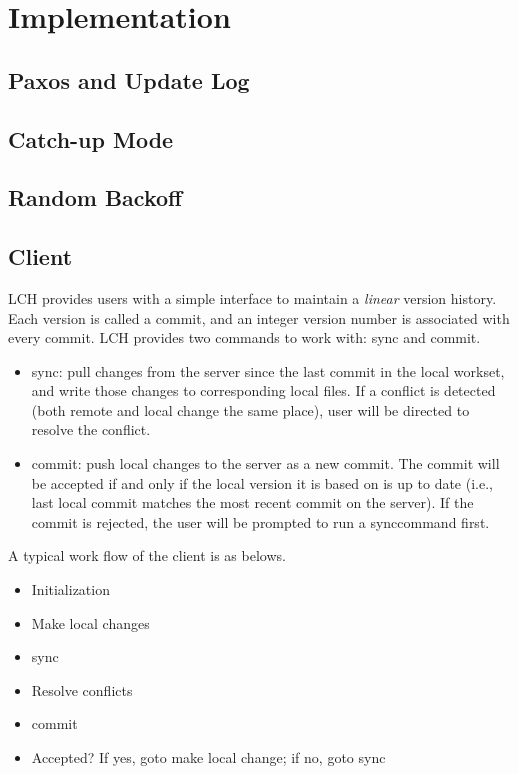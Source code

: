 \documentclass[11pt]{article}
\begin{document}
\section{Implementation}
\label{sec:impl}
\subsection{Paxos and Update Log}
\subsection{Catch-up Mode}
\subsection{Random Backoff}
\subsection{Client}

LCH provides users with a simple interface to maintain a \emph{linear} version history. Each version is called a commit, and an integer version number is associated with every commit. LCH provides two commands to work with: sync and commit. 
\begin{itemize}
  \item sync: pull changes from the server since the last commit in the local workset, and write those changes to corresponding local files. If a conflict is detected (both remote and local change the same place), user will be directed to resolve the conflict.
  \item commit: push local changes to the server as a new commit. The commit will be accepted if and only if the local version it is based on is up to date (i.e., last local commit matches the most recent commit on the server). If the commit is rejected, the user will be prompted to run a synccommand first.

\end{itemize}
A typical work flow of the client is as belows.
\begin{itemize}
  \item Initialization
  \item Make local changes
  \item sync
  \item Resolve conflicts
  \item commit
  \item Accepted? If yes, goto make local change; if no, goto sync
\end{itemize}
\end{document}
